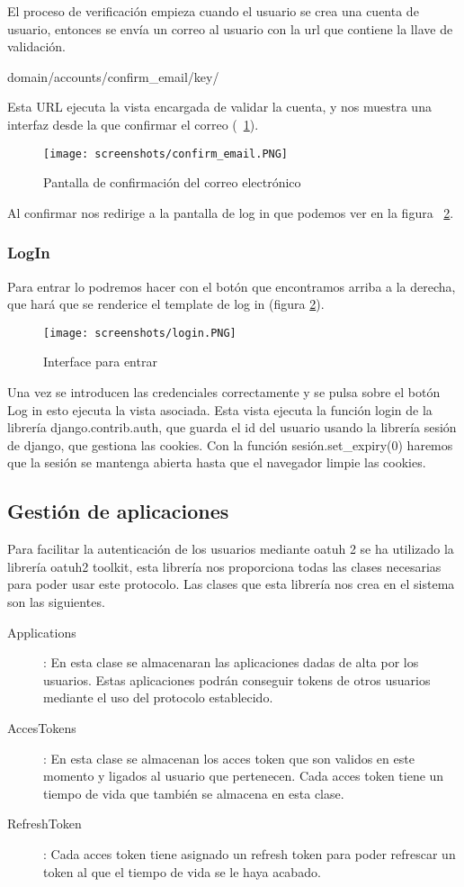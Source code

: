 El proceso de verificación empieza cuando el usuario se crea una cuenta de usuario, entonces se envía un correo  al usuario con la url que contiene la llave de validación.


{domain}/accounts/confirm\_email/{key}/

Esta URL ejecuta la vista encargada de validar la cuenta, y nos muestra una interfaz desde la que confirmar el correo (~\ref{fig:confirm_email}).
\begin{figure}[ht!]
\center
\texttt{[image: screenshots/confirm\_email.PNG]}
\caption{Pantalla de confirmación del correo electrónico}
\label{fig:confirm_email}
\end{figure}

Al confirmar nos redirige a la pantalla de log in que podemos ver en la figura ~\ref{fig:login}.

\subsubsection{LogIn}
Para entrar lo podremos hacer con el botón que encontramos arriba a la derecha, que hará que se renderice el template de log in (figura \ref{fig:login}).
\begin{figure}[ht!]
\center
\texttt{[image: screenshots/login.PNG]}
\caption{Interface para entrar}
\label{fig:login}
\end{figure}

Una vez se introducen las credenciales correctamente y se pulsa sobre el botón Log in esto ejecuta la vista asociada. Esta vista ejecuta la función login de la librería django.contrib.auth, que guarda el id del usuario usando la librería sesión de django, que gestiona las cookies. Con la función sesión.set\_expiry(0) haremos que la sesión se mantenga abierta hasta que el navegador limpie las cookies.


\subsection{Gestión de aplicaciones}
Para facilitar la autenticación de los usuarios mediante oatuh 2 se ha utilizado la librería oatuh2 toolkit, esta librería nos proporciona todas las clases necesarias para poder usar este protocolo. Las clases que esta librería nos crea en el sistema son las siguientes.
\begin{description}
\item[Applications]: En esta clase se almacenaran las aplicaciones dadas de alta por los usuarios. Estas aplicaciones podrán conseguir tokens de otros usuarios mediante el uso del protocolo establecido.
\item[AccesTokens]: En esta clase se almacenan los acces token que son validos en este momento y ligados al usuario que pertenecen. Cada acces token tiene un tiempo de vida que también se almacena en esta clase.
\item[RefreshToken]: Cada acces token tiene asignado un refresh token para poder refrescar un token al que el tiempo de vida se le haya acabado.
\end{description}

